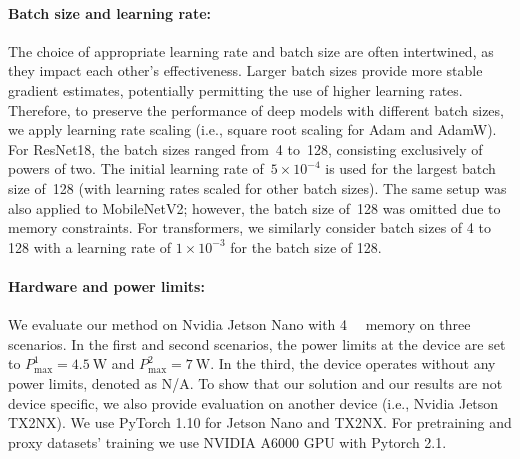 


\paragraph{Batch size and learning rate:} The choice of appropriate learning rate and batch size are often intertwined, as they impact each other’s effectiveness. Larger batch sizes provide more stable gradient estimates, potentially permitting the use of higher learning rates. 
Therefore, to preserve the performance of deep models with different batch sizes, we apply learning rate scaling (i.e., square root scaling \cite{krizhevsky2014one} for Adam and AdamW). For ResNet18, the batch sizes ranged from~4 to~128, consisting exclusively of powers of two. The initial learning rate of~$5 \times 10^{-4}$ is used for the largest batch size of~128 (with learning rates scaled for other batch sizes). The same setup was also applied to MobileNetV2; however, the batch size of~128 was omitted due to memory constraints.
For transformers, we similarly consider batch sizes of 4 to 128 with a learning rate of $1 \times 10^{-3}$ for the batch size of 128. 


\paragraph{Hardware and power limits:} 

We evaluate our method on Nvidia Jetson Nano with \qty{4}{\giga\byte} memory on three scenarios. In the first and second scenarios, the power limits at the device are set to $P_{\text{max}}^{1} = \SI{4.5}{\watt}$ and $P_{\text{max}}^{2} = \SI{7}{\watt}$. In the third, the device operates without any power limits, denoted as N/A.  To show that our solution and our results are not device specific, we also provide evaluation on another device (i.e., Nvidia Jetson TX2NX). We use PyTorch 1.10 \cite{pytorch_cite} for Jetson Nano and TX2NX. For pretraining and proxy datasets' training we use NVIDIA A6000 GPU with Pytorch 2.1.

